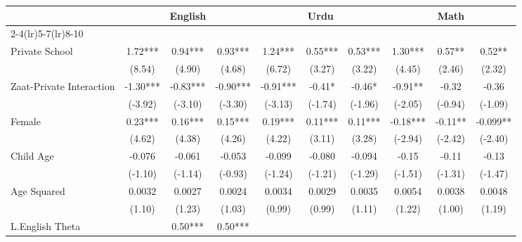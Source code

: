\begin{sidewaystable}[htbp]\centering
\def\sym#1{\ifmmode^{#1}\else\(^{#1}\)\fi}
\caption{Class 4 Private School Premium, Controlling for Class 3 Scores \label{crosssection}}
\begin{tabular}{l*{9}{c}}
\toprule
                &\multicolumn{3}{c}{English}           &\multicolumn{3}{c}{Urdu}              &\multicolumn{3}{c}{Math}              \\\cmidrule(lr){2-4}\cmidrule(lr){5-7}\cmidrule(lr){8-10}
                &\multicolumn{1}{c}{}&\multicolumn{1}{c}{}&\multicolumn{1}{c}{}&\multicolumn{1}{c}{}&\multicolumn{1}{c}{}&\multicolumn{1}{c}{}&\multicolumn{1}{c}{}&\multicolumn{1}{c}{}&\multicolumn{1}{c}{}\\
\midrule
Private School  &     1.72***&     0.94***&     0.93***&     1.24***&     0.55***&     0.53***&     1.30***&     0.57** &     0.52** \\
                &   (8.54)   &   (4.90)   &   (4.68)   &   (6.72)   &   (3.27)   &   (3.22)   &   (4.45)   &   (2.46)   &   (2.32)   \\
Zaat-Private Interaction&    -1.30***&    -0.83***&    -0.90***&    -0.91***&    -0.41*  &    -0.46*  &    -0.91** &    -0.32   &    -0.36   \\
                &  (-3.92)   &  (-3.10)   &  (-3.30)   &  (-3.13)   &  (-1.74)   &  (-1.96)   &  (-2.05)   &  (-0.94)   &  (-1.09)   \\
Female          &     0.23***&     0.16***&     0.15***&     0.19***&     0.11***&     0.11***&    -0.18***&    -0.11** &   -0.099** \\
                &   (4.62)   &   (4.38)   &   (4.26)   &   (4.22)   &   (3.11)   &   (3.28)   &  (-2.94)   &  (-2.42)   &  (-2.40)   \\
Child Age       &   -0.076   &   -0.061   &   -0.053   &   -0.099   &   -0.080   &   -0.094   &    -0.15   &    -0.11   &    -0.13   \\
                &  (-1.10)   &  (-1.14)   &  (-0.93)   &  (-1.24)   &  (-1.21)   &  (-1.29)   &  (-1.51)   &  (-1.31)   &  (-1.47)   \\
Age Squared     &   0.0032   &   0.0027   &   0.0024   &   0.0034   &   0.0029   &   0.0035   &   0.0054   &   0.0038   &   0.0048   \\
                &   (1.10)   &   (1.23)   &   (1.03)   &   (0.99)   &   (0.99)   &   (1.11)   &   (1.22)   &   (1.00)   &   (1.19)   \\
L.English Theta &            &     0.50***&     0.50***&            &            &            &            &            &            \\

\end{tabular}
\end{sidewaystable}
